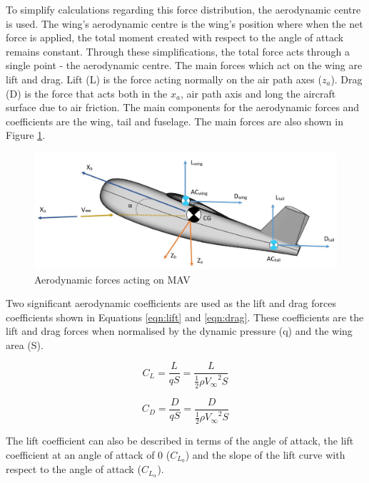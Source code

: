 To simplify calculations regarding this force distribution, the aerodynamic centre is used. The wing's aerodynamic centre is the wing's position where when the net force is applied, the total moment created with respect to the angle of attack remains constant. Through these simplifications, the total force acts through a single point - the aerodynamic centre. The main forces which act on the wing are lift and drag. Lift (L) is the force acting normally on the air path axes ($z_a$). Drag (D) is the force that acts both in the $x_a$, air path axis and long the aircraft surface due to air friction. The main components for the aerodynamic forces and coefficients are the wing, tail and fuselage. The main forces are also shown in Figure \ref{fig:aeroforces}.



\begin{figure}[H]
  \centering
  \includegraphics[width=1\linewidth]{03_LiteratureReview/Figs/Aeroforces2.JPG}
  \caption{Aerodynamic forces acting on \acrshort{MAV}}
  \label{fig:aeroforces}
\end{figure}
Two significant aerodynamic coefficients are used as the lift and drag forces coefficients shown in Equations \ref{eqn:lift} and \ref{eqn:drag}. These coefficients are the lift and drag forces when normalised by the dynamic pressure (q) and the wing area (S). 


\begin{equation}
    C_L = \frac{L}{qS} = \frac{L}{\frac{1}{2}\rho {V_\infty}^2 S}
    \label{eqn:lift}
\end{equation}

\begin{equation}
     C_D = \frac{D}{qS} = \frac{D}{\frac{1}{2}\rho {V_\infty}^2 S}
     \label{eqn:drag}
\end{equation}

The lift coefficient can also be described in terms of the angle of attack, the lift coefficient at an angle of attack of 0 ($C_{L_0}$) and the slope of the lift curve with respect to the angle of attack ($C_{L_\alpha}$). 

